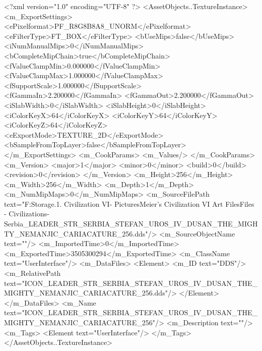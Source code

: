<?xml version="1.0" encoding="UTF-8" ?>
<AssetObjects..TextureInstance>
	<m_ExportSettings>
		<ePixelformat>PF_R8G8B8A8_UNORM</ePixelformat>
		<eFilterType>FT_BOX</eFilterType>
		<bUseMips>false</bUseMips>
		<iNumManualMips>0</iNumManualMips>
		<bCompleteMipChain>true</bCompleteMipChain>
		<fValueClampMin>0.000000</fValueClampMin>
		<fValueClampMax>1.000000</fValueClampMax>
		<fSupportScale>1.000000</fSupportScale>
		<fGammaIn>2.200000</fGammaIn>
		<fGammaOut>2.200000</fGammaOut>
		<iSlabWidth>0</iSlabWidth>
		<iSlabHeight>0</iSlabHeight>
		<iColorKeyX>64</iColorKeyX>
		<iColorKeyY>64</iColorKeyY>
		<iColorKeyZ>64</iColorKeyZ>
		<eExportMode>TEXTURE_2D</eExportMode>
		<bSampleFromTopLayer>false</bSampleFromTopLayer>
	</m_ExportSettings>
	<m_CookParams>
		<m_Values/>
	</m_CookParams>
	<m_Version>
		<major>1</major>
		<minor>0</minor>
		<build>0</build>
		<revision>0</revision>
	</m_Version>
	<m_Height>256</m_Height>
	<m_Width>256</m_Width>
	<m_Depth>1</m_Depth>
	<m_NumMipMaps>0</m_NumMipMaps>
	<m_SourceFilePath text="F:\Mod Storage\2.1. Civilization VI\Mods\Archive - Pictures\Sid Meier's Civilization VI Art Files\Art Files - Civilizations\Civilization - Serbia\ICON_LEADER_STR_SERBIA_STEFAN_UROS_IV_DUSAN_THE_MIGHTY_NEMANJIC_CARIACATURE_256.dds"/>
	<m_SourceObjectName text=""/>
	<m_ImportedTime>0</m_ImportedTime>
	<m_ExportedTime>3505300294</m_ExportedTime>
	<m_ClassName text="UserInterface"/>
	<m_DataFiles>
		<Element>
			<m_ID text="DDS"/>
			<m_RelativePath text="ICON_LEADER_STR_SERBIA_STEFAN_UROS_IV_DUSAN_THE_MIGHTY_NEMANJIC_CARIACATURE_256.dds"/>
		</Element>
	</m_DataFiles>
	<m_Name text="ICON_LEADER_STR_SERBIA_STEFAN_UROS_IV_DUSAN_THE_MIGHTY_NEMANJIC_CARIACATURE_256"/>
	<m_Description text=""/>
	<m_Tags>
		<Element text="UserInterface"/>
	</m_Tags>
</AssetObjects..TextureInstance>

